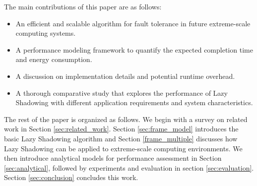 The main contributions of this paper are as follows:
\begin{itemize}
	\item An efficient and scalable algorithm for fault tolerance in future extreme-scale computing systems.
    \item A performance modeling framework to quantify the expected completion time and energy consumption.
    \item A discussion on implementation details and potential runtime overhead.
	\item A thorough comparative study that explores the performance of Lazy Shadowing with different application requirements and system characteristics.
\end{itemize}


The rest of the paper is organized as follows. We begin with a survey on related work in Section 
\ref{sec:related_work}. Section \ref{sec:frame_model} introduces the basic Lazy Shadowing algorithm and Section \ref{frame_multiple} discusses how Lazy Shadowing can be applied to 
extreme-scale computing environments. 
We then introduce analytical models for performance assessment
in Section \ref{sec:analytical}, 
followed by experiments and evaluation in
section \ref{sec:evaluation}. Section \ref{sec:conclusion} concludes this work.%
